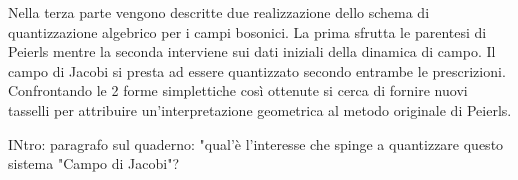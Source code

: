 \documentclass[Main]{subfiles}
\begin{document}
Nella terza parte vengono descritte due  realizzazione dello schema di quantizzazione algebrico per i campi bosonici. La prima sfrutta le parentesi di Peierls mentre la seconda interviene sui dati iniziali della dinamica di campo.
\newline
Il campo di Jacobi si presta ad essere quantizzato secondo entrambe le prescrizioni.
Confrontando le 2 forme simplettiche così ottenute si cerca di fornire nuovi tasselli per attribuire un'interpretazione geometrica al metodo originale di Peierls.


	\begin{Warning}
	INtro: paragrafo sul quaderno: "qual'è l'interesse che spinge a quantizzare questo sistema "Campo di Jacobi"?
	\end{Warning}
\fi
\end{document}
